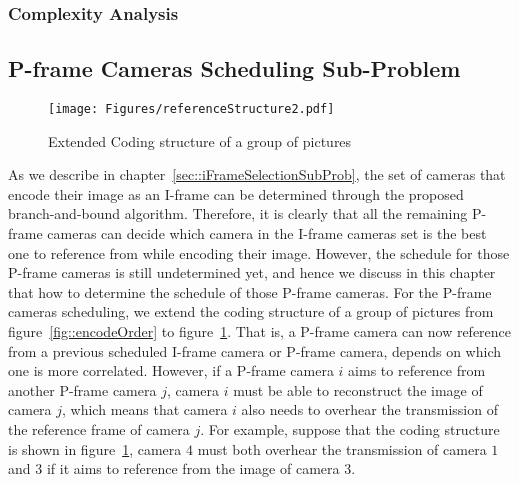 \subsubsection{Complexity Analysis}
%
%
%
\subsection{P-frame Cameras Scheduling Sub-Problem}
%
\begin{figure}
\begin{center}
\texttt{[image: Figures/referenceStructure2.pdf]}
\caption{\label{fig::encodeOrder2}Extended Coding structure of a group of pictures}
\end{center}
\end{figure}
%
As we describe in chapter~\ref{sec::iFrameSelectionSubProb}, the set of cameras that encode their image as an I-frame can be determined through the proposed branch-and-bound algorithm.
Therefore, it is clearly that all the remaining P-frame cameras can decide which camera in the I-frame cameras set is the best one to reference from while encoding their image.
However, the schedule for those P-frame cameras is still undetermined yet, and hence we discuss in this chapter that how to determine the schedule of those P-frame cameras.
For the P-frame cameras scheduling, we extend the coding structure of a group of pictures from figure~\ref{fig::encodeOrder} to figure~\ref{fig::encodeOrder2}.
That is, a P-frame camera can now reference from a previous scheduled I-frame camera or P-frame camera, depends on which one is more correlated.
However, if a P-frame camera $i$ aims to reference from another P-frame camera $j$, camera $i$ must be able to reconstruct the image of camera $j$, which means that camera $i$ also needs to overhear the transmission of the reference frame of camera $j$.
For example, suppose that the coding structure is shown in figure~\ref{fig::encodeOrder2}, camera $4$ must both overhear the transmission of camera $1$ and $3$ if it aims to reference from the image of camera $3$.
%